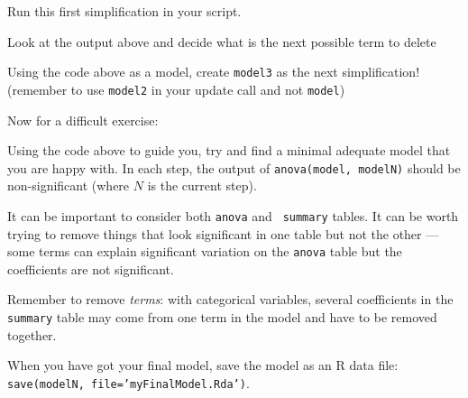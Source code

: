 \begin{compactitem}[$\quad\star$]
	\item Run this first simplification in your script.
	\item Look at the output above and decide what is the next possible 
	term to delete
	\item Using the code above as a model, create {\tt model3} as the 
	next simplification! (remember to use {\tt model2} in your update 
	call and not {\tt model})
\end{compactitem}

Now for a difficult exercise:

\begin{compactitem}[$\quad\star$]
	\item Using the code above to guide you, try and find a minimal 
	adequate model that you are happy with. In each step, the output of 
	{\tt anova(model, modelN)} should be non-significant (where $N$ is 
	the current step).

	\item It can be important to consider both {\tt anova} and {\tt 
	summary} tables. It can be worth trying to remove things that look 
	significant in one table but not the other --- some terms can explain 
	significant variation on the {\tt anova} table but the coefficients 
	are not significant. 

	\item Remember to remove {\it terms}: with categorical variables, 
	several coefficients in the {\tt summary} table may come from one 
	term in the model and have to be removed together.

	\item When you have got your final model, save the model as an R data 
	file:\\
	{\tt save(modelN, file='myFinalModel.Rda')}.


\end{compactitem}
